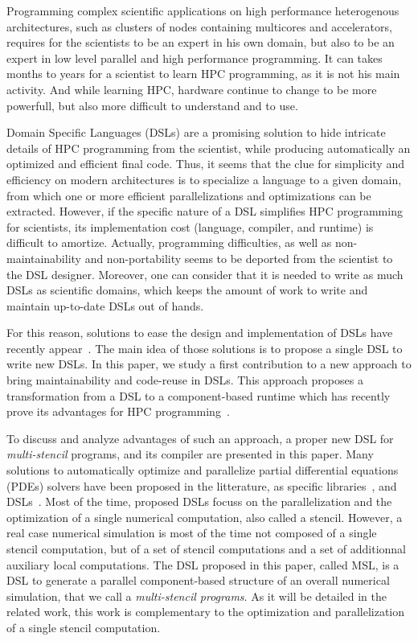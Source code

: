Programming complex scientific applications on high performance heterogenous architectures, such as clusters of nodes containing multicores and accelerators, requires for the scientists to be an expert in his own domain, but also to be an expert in low level parallel and high performance programming. It can takes months to years for a scientist to learn HPC programming, as it is not his main activity. And while learning HPC, hardware continue to change to be more powerfull, but also more difficult to understand and to use.

Domain Specific Languages (DSLs) are a promising solution to hide intricate details of HPC programming from the scientist, while producing automatically an optimized and efficient final code. Thus, it seems that the clue for simplicity and efficiency on modern architectures is to specialize a language to a given domain, from which one or more efficient parallelizations and optimizations can be extracted.
However, if the specific nature of a DSL simplifies HPC programming for scientists, its implementation cost (language, compiler, and runtime) is difficult to amortize. Actually, programming difficulties, as well as non-maintainability and non-portability seems to be deported from the scientist to the DSL designer. Moreover, one can consider that it is needed to write as much DSLs as scientific domains, which keeps the amount of work to write and maintain up-to-date DSLs out of hands.

For this reason, solutions to ease the design and implementation of DSLs have recently appear~\cite{Fernandez:2014:DFL:2691166.2691168}. The main idea of those solutions is to propose a single DSL to write new DSLs. In this paper, we study a first contribution to a new approach to bring maintainability and code-reuse in DSLs. This approach proposes a transformation from a DSL to a component-based runtime which has recently prove its advantages for HPC programming~\cite{l2c}.

To discuss and analyze advantages of such an approach, a proper new DSL for \emph{multi-stencil} programs, and its compiler are presented in this paper. Many solutions to automatically optimize and parallelize partial differential equations (PDEs) solvers have been proposed in the litterature, as specific libraries~\cite{petsc-efficient,Trilinos-Overview,CPE:CPE3494}, and DSLs~\cite{spaaTangCKLL11,citeulike12258902,Giles2011,DeVito2011LDS}. Most of the time, proposed DSLs focuss on the parallelization and the optimization of a single numerical computation, also called a stencil.
However, a real case numerical simulation is most of the time not composed of a single stencil computation, but of a set of stencil computations and a set of additionnal auxiliary local computations. The DSL proposed in this paper, called MSL, is a DSL to generate a parallel component-based structure of an overall numerical simulation, that we call a \emph{multi-stencil programs}. As it will be detailed in the related work, this work is complementary to the optimization and parallelization of a single stencil computation.

